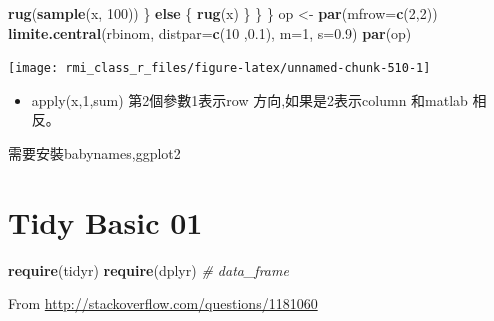 \documentclass[]{book}
\newenvironment{Shaded}{\begin{snugshade}}{\end{snugshade}}
\newcommand{\CommentTok}[1]{\textcolor[rgb]{0.56,0.35,0.01}{\textit{#1}}}
\newcommand{\ControlFlowTok}[1]{\textcolor[rgb]{0.13,0.29,0.53}{\textbf{#1}}}
\newcommand{\DataTypeTok}[1]{\textcolor[rgb]{0.13,0.29,0.53}{#1}}
\newcommand{\DecValTok}[1]{\textcolor[rgb]{0.00,0.00,0.81}{#1}}
\newcommand{\FloatTok}[1]{\textcolor[rgb]{0.00,0.00,0.81}{#1}}
\newcommand{\KeywordTok}[1]{\textcolor[rgb]{0.13,0.29,0.53}{\textbf{#1}}}
\newcommand{\NormalTok}[1]{#1}
\newcommand{\StringTok}[1]{\textcolor[rgb]{0.31,0.60,0.02}{#1}}
\providecommand{\tightlist}{%
  \setlength{\itemsep}{0pt}\setlength{\parskip}{0pt}}
\theoremstyle{definition}
\theoremstyle{definition}
\theoremstyle{definition}
\theoremstyle{remark}
\begin{document}
\begin{Shaded}
\begin{Highlighting}[]
        \KeywordTok{rug}\NormalTok{(}\KeywordTok{sample}\NormalTok{(x, }\DecValTok{100}\NormalTok{))}
\NormalTok{      \} }\ControlFlowTok{else}\NormalTok{ \{}
        \KeywordTok{rug}\NormalTok{(x)}
\NormalTok{      \}}
\NormalTok{    \}}
\NormalTok{  \}}
\NormalTok{op <-}\StringTok{ }\KeywordTok{par}\NormalTok{(}\DataTypeTok{mfrow=}\KeywordTok{c}\NormalTok{(}\DecValTok{2}\NormalTok{,}\DecValTok{2}\NormalTok{))}
\KeywordTok{limite.central}\NormalTok{(rbinom, }\DataTypeTok{distpar=}\KeywordTok{c}\NormalTok{(}\DecValTok{10}\NormalTok{ ,}\FloatTok{0.1}\NormalTok{), }\DataTypeTok{m=}\DecValTok{1}\NormalTok{, }\DataTypeTok{s=}\FloatTok{0.9}\NormalTok{)}
\KeywordTok{par}\NormalTok{(op)}
\end{Highlighting}
\end{Shaded}

\begin{center}\texttt{[image: rmi\_class\_r\_files/figure-latex/unnamed-chunk-510-1]} \end{center}

\begin{itemize}
\tightlist
\item
  apply(x,1,sum) 第2個參數1表示row 方向,如果是2表示column 和matlab
  相反。
\end{itemize}

\begin{Shaded}
\begin{Highlighting}[]
\NormalTok{需要安裝babynames,ggplot2}
\end{Highlighting}
\end{Shaded}

\hypertarget{tidy-basic-01}{%
\chapter{Tidy Basic 01}\label{tidy-basic-01}}

\begin{Shaded}
\begin{Highlighting}[]
\KeywordTok{require}\NormalTok{(tidyr)}
\KeywordTok{require}\NormalTok{(dplyr) }\CommentTok{# data_frame}
\end{Highlighting}
\end{Shaded}

From \url{http://stackoverflow.com/questions/1181060}
\end{document}
